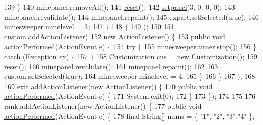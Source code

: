 \begin{DoxyCode}
139                         \}
140                         minepanel.removeAll();
141                         \hyperlink{classhufs_1_1cse_1_1khk_1_1_minesweeper_u_i_a137388c25def2c90fe13e34d6234207d}{reset}();
142                         \hyperlink{classhufs_1_1cse_1_1khk_1_1_minesweeper_u_i_a9a871b3969d0f0c00cf420902d09cc18}{setpanel}(3, 0, 0, 0);
143                         minepanel.revalidate();
144                         minepanel.repaint();
145                         expart.setSelected(\textcolor{keyword}{true});
146                         minesweeper.minelevel = 3;
147                     \}
148                 \}
149         );
150  
151         custom.addActionListener(
152                 \textcolor{keyword}{new} ActionListener() \{
153                     \textcolor{keyword}{public} \textcolor{keywordtype}{void} \hyperlink{classhufs_1_1cse_1_1khk_1_1_minesweeper_u_i_a896a8e57a116a0b4b43fb88b575ab5b8}{actionPerformed}(ActionEvent e) \{
154                         \textcolor{keywordflow}{try} \{
155                             minesweeper.timer.\hyperlink{classhufs_1_1cse_1_1khk_1_1_timer_a5ab9e7bd1e1b1f74604887cd99b27972}{stop}();
156                         \} \textcolor{keywordflow}{catch} (Exception ex) \{                        
157                         \}
158                         Customization cus = \textcolor{keyword}{new} Customization();
159                         \hyperlink{classhufs_1_1cse_1_1khk_1_1_minesweeper_u_i_a137388c25def2c90fe13e34d6234207d}{reset}();
160                         minepanel.revalidate();
161                         minepanel.repaint();
162  
163                         custom.setSelected(\textcolor{keyword}{true});
164                         minesweeper.minelevel = 4;
165                     \}
166                 \}
167         );
168  
169         exit.addActionListener(\textcolor{keyword}{new} ActionListener() \{
170             \textcolor{keyword}{public} \textcolor{keywordtype}{void} \hyperlink{classhufs_1_1cse_1_1khk_1_1_minesweeper_u_i_a896a8e57a116a0b4b43fb88b575ab5b8}{actionPerformed}(ActionEvent e) \{
171                 System.exit(0);
172             \}
173         \});
174         
175         
176         rank.addActionListener(\textcolor{keyword}{new} ActionListener() \{
177             \textcolor{keyword}{public} \textcolor{keywordtype}{void} \hyperlink{classhufs_1_1cse_1_1khk_1_1_minesweeper_u_i_a896a8e57a116a0b4b43fb88b575ab5b8}{actionPerformed}(ActionEvent e) \{
178                 \textcolor{keyword}{final} String[] nums = \{ \textcolor{stringliteral}{"1"}, \textcolor{stringliteral}{"2"}, \textcolor{stringliteral}{"3"},\textcolor{stringliteral}{"4"} \};

\end{DoxyCode}
